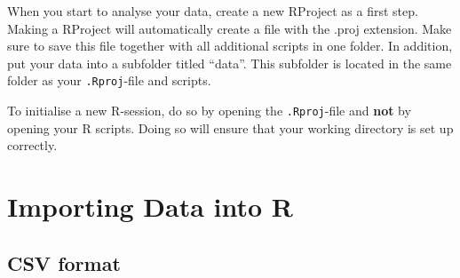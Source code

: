\documentclass[
  letterpaper,
  DIV=11,
  numbers=noendperiod,
  oneside]{scrreprt}
\begin{document}
\begin{tcolorbox}[enhanced jigsaw, leftrule=.75mm, colframe=quarto-callout-tip-color-frame, left=2mm, breakable, bottomrule=.15mm, rightrule=.15mm, colback=white, opacityback=0, arc=.35mm, toprule=.15mm]
\begin{minipage}[t]{5.5mm}
\textcolor{quarto-callout-tip-color}{\faLightbulb}
\end{minipage}%
\begin{minipage}[t]{\textwidth - 5.5mm}

When you start to analyse your data, create a new RProject as a first
step. Making a RProject will automatically create a file with the .proj
extension. Make sure to save this file together with all additional
scripts in one folder. In addition, put your data into a subfolder
titled ``data''. This subfolder is located in the same folder as your
\texttt{.Rproj}-file and scripts.

\end{minipage}%
\end{tcolorbox}

\begin{tcolorbox}[enhanced jigsaw, leftrule=.75mm, colframe=quarto-callout-caution-color-frame, left=2mm, breakable, bottomrule=.15mm, rightrule=.15mm, colback=white, opacityback=0, arc=.35mm, toprule=.15mm]
\begin{minipage}[t]{5.5mm}
\textcolor{quarto-callout-caution-color}{\faFire}
\end{minipage}%
\begin{minipage}[t]{\textwidth - 5.5mm}

To initialise a new R-session, do so by opening the \texttt{.Rproj}-file
and \textbf{not} by opening your R scripts. Doing so will ensure that
your working directory is set up correctly.

\end{minipage}%
\end{tcolorbox}


\hypertarget{importing-data-into-r}{%
\chapter{Importing Data into R}\label{importing-data-into-r}}

\hfill\break

\hypertarget{csv-format}{%
\section{CSV format}\label{csv-format}}
\end{document}
